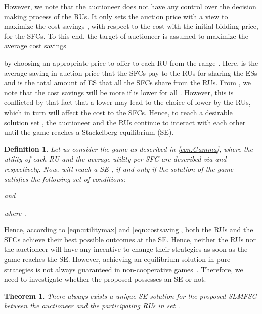 \documentclass[journal,10pt]{IEEEtran}
\newtheorem{theorem}{\bf Theorem}
\newtheorem{definition}{\bf Definition}
\begin{document}
However, we note that the auctioneer does not have any control over the decision making process of the RUs. It only sets the auction price  with a view to maximize the cost savings , with respect to the cost with the initial bidding price, for the SFCs. To this end, the target of auctioneer is assumed to maximize the average cost savings

by choosing an appropriate price  to offer to each RU from the range . Here,  is the average saving in auction price that the SFCs pay to the RUs for sharing the ESs and  is the total amount of ES that all the SFCs share from the RUs. From , we note that the cost savings will be more if  is lower for all . However, this is conflicted by that fact that a lower  may lead to the choice of lower  by the RUs, which in turn will affect the cost to the SFCs. Hence, to reach a desirable solution set , the auctioneer and the RUs continue to interact with each other until the game reaches a Stackelberg equilibrium (SE).
\begin{definition}
Let us consider the game  as described in \eqref{eqn:Gamma}, where the utility of each RU  and the average utility per SFC are described via  and  respectively. Now,  will reach a SE , if and only if the solution of the game satisfies the following set of conditions:

and

where .
\end{definition}
Hence, according to \eqref{eqn:utilitymax} and \eqref{eqn:costsaving}, both the RUs and the SFCs achieve their best possible outcomes at the SE. Hence, neither the RUs nor the auctioneer will have any incentive to change their strategies as soon as the game  reaches the SE. However, achieving an equilibrium solution in pure strategies is not always guaranteed in non-cooperative games~\cite{Wayes-J-TSG:2012}. Therefore, we need to investigate whether the proposed  possesses an SE or not.
\begin{theorem}
There always exists a unique SE solution for the proposed SLMFSG  between the auctioneer and the participating RUs in set .
\label{theorem:1}
\end{theorem}
\end{document}
